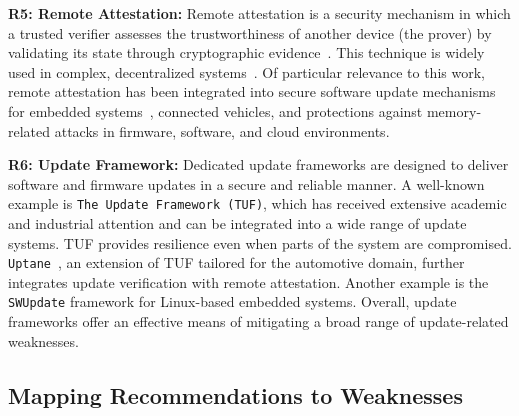 \documentclass[fleqn,s1,names,tex]{neptune}
\begin{document}
 

\cvpt\textbf{R5: Remote Attestation:}  
Remote attestation is a security mechanism in which a trusted verifier assesses
the trustworthiness of another device (the prover) by validating its state
through cryptographic
evidence~\citep{10.1145/3627106.3627202,10.1145/3579988.3585056}. This
technique is widely used in complex, decentralized
systems~\citep{10.1145/3327961.3329529}. 
Of particular relevance to this work, remote attestation has been integrated
into secure software update mechanisms for embedded
systems~\citep{10.1007/s10207-026-01233-1}, connected vehicles, and protections
against memory-related attacks in firmware, software, and cloud environments.








 

\cvpt\textbf{R6: Update Framework:}  
Dedicated update frameworks are designed to deliver software and firmware updates in a secure and reliable manner. 
A well-known example is \texttt{The Update Framework (TUF)}, which has received extensive academic and industrial attention and can be integrated into a wide range of update systems. 
TUF provides resilience even when parts of the system are compromised.
\texttt{Uptane}~\citep{10.1145/3678890.3678927}, an extension of TUF tailored
for the automotive domain, further integrates update verification with remote
attestation.
Another example is the \texttt{SWUpdate} framework for Linux-based embedded systems.
Overall, update frameworks offer an effective means of mitigating a broad range of update-related weaknesses.




  



\subsection{Mapping Recommendations to Weaknesses }
\end{document}
